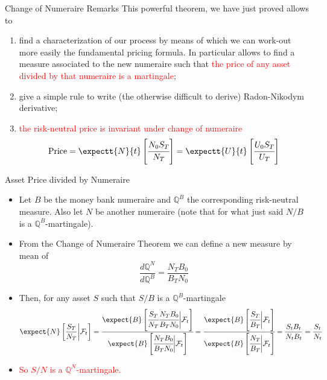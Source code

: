 \documentclass{beamer}
\begin{document}
\begin{frame}{Change of Numeraire Remarks}
  This powerful theorem, we have just proved allows to
\begin{enumerate}
    \item find a characterization of our process by means of which we can work-out more easily the fundamental pricing formula. In particular allows to find a measure associated to the new numeraire such that \textcolor{red}{the price of any asset divided by that numeraire is a martingale};
    \item give a simple rule to write (the otherwise difficult to derive) Radon-Nikodym derivative;
      \item \textcolor{red}{the risk-neutral price is invariant under change of numeraire}
    \begin{equation*}
    	\text{Price} = \expectt{N}{t}\left[\cfrac{N_0 S_T}{N_T}\right] = \expectt{U}{t}\left[\cfrac{U_0 S_T}{U_T}\right]
    \end{equation*}
    \end{enumerate}
\end{frame}

\begin{frame}{Asset Price divided by Numeraire}
	\begin{itemize}
 	\item<1-> Let $B$ be the money bank numeraire and $\mathbb{Q}^B$ the corresponding risk-neutral measure. Also let $N$ be another numeraire (note that for what just said $N/B$ is a $\mathbb{Q}^B$-martingale). 
	\item<2-> From the Change of Numeraire Theorem we can define a new measure by mean of
  \begin{equation*}
    \frac{d\mathbb{Q}^N}{d\mathbb{Q}^B} = \frac{N_TB_0}{B_TN_0}
  \end{equation*}
	\item<3-> Then, for any asset $S$ such that $S/B$ is a $\mathbb{Q}^B$-martingale
  \begin{equation*}
    \expect{N}\left[\frac{S_T}{N_T}\bigg|\mathcal{F}_t\right] = \cfrac{\expect{B}\left[\cfrac{S_T}{N_T}\cfrac{N_TB_0}{B_TN_0}\bigg|\mathcal{F}_t\right]}{\expect{B}\left[\cfrac{N_TB_0}{B_TN_0}\bigg|\mathcal{F}_t\right]}
    =\cfrac{\expect{B}\left[\cfrac{S_T}{B_T}\bigg|\mathcal{F}_t\right]}
    {\expect{B}\left[\cfrac{N_T}{B_T}\bigg|\mathcal{F}_t\right]}
    =\frac{S_tB_t}{N_tB_t}=\frac{S_t}{N_t}
  \end{equation*}
\myendproof
	\item<4-> \textcolor{red}{So $S/N$ is a $\mathbb{Q}^N$-martingale.}
	\end{itemize}
\end{frame}
\end{document}
